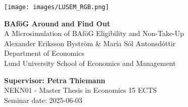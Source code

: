 
\sloppy  %

\texttt{[image: images/LUSEM\_RGB.png]} %

\vspace{2cm}
\begin{center}       
    \vspace*{2cm}
    {\Large \textbf{BAföG Around and Find Out} \\ 
    A Microsimulation of BAföG Eligibility and Non-Take-Up} \\
    \vspace{1cm}
    \large Alexander Eriksson Byström \& María Sól Antonsdóttir \\[0.3cm]
    \normalsize Department of Economics \\ 
    Lund University School of Economics and Management
\end{center}
\vspace{2cm}

\vfill
\noindent 
\textbf{Supervisor: Petra Thiemann} \\ 
NEKN01 - Master Thesis in Economics 15 ECTS \\ 
Seminar date: 2025-06-03
\thispagestyle{empty}

\fussy  %

\newpage
\tableofcontents
\thispagestyle{empty}



